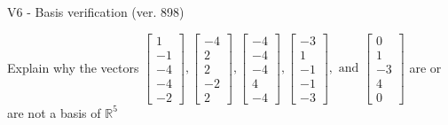 \begin{exercise}
  \begin{exerciseTitle}V6 - Basis verification (ver. 898)\end{exerciseTitle}
  \begin{exerciseStatement}
    Explain why the vectors \(\left[\begin{array}{r}
1 \\
-1 \\
-4 \\
-4 \\
-2
\end{array}\right] , \left[\begin{array}{r}
-4 \\
2 \\
2 \\
-2 \\
2
\end{array}\right] , \left[\begin{array}{r}
-4 \\
-4 \\
-4 \\
4 \\
-4
\end{array}\right] , \left[\begin{array}{r}
-3 \\
1 \\
-1 \\
-1 \\
-3
\end{array}\right] , \text{ and } \left[\begin{array}{r}
0 \\
1 \\
-3 \\
4 \\
0
\end{array}\right]\) are or are not a basis of \(\mathbb{R}^5\)	



\end{exerciseStatement}
\end{exercise}
